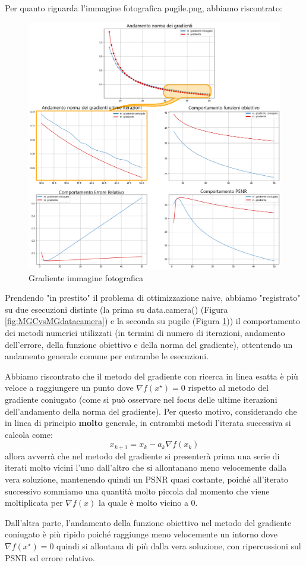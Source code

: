 Per quanto riguarda l'immagine fotografica pugile.png, abbiamo riscontrato: 

\begin{figure}[H]
    \centering
    \includegraphics[width=\textwidth]{output/MGCvsMG-pugile-enph.png}
    \caption{Gradiente immagine fotografica}
    \label{fig:MGCvsMG-pugile}
\end{figure}

Prendendo "in prestito" il problema di ottimizzazione naive,
abbiamo "registrato" su due esecuzioni distinte (la prima su data.camera() 
(Figura \ref{fig:MGCvsMGdatacamera}) e la seconda su pugile 
(Figura \ref{fig:MGCvsMG-pugile}))
il comportamento dei metodi numerici utilizzati (in termini di numero di iterazioni, andamento 
dell'errore, della funzione obiettivo e della norma del gradiente), ottentendo un andamento 
generale comune per entrambe le esecuzioni.

Abbiamo riscontrato che il metodo del gradiente con ricerca in linea esatta è più veloce a
 raggiungere un punto dove $\nabla f(x^{\star})=0$ rispetto al metodo del gradiente coniugato
 (come si può osservare nel focus delle ultime iterazioni dell'andamento della norma del gradiente).
 Per questo motivo, considerando 
 che in linea di principio \textbf{molto} generale, in entrambii metodi l'iterata successiva si calcola come:
 \[x_{k+1} = x_k - a_k \nabla f(x_k)\]
allora avverrà che nel metodo del gradiente si presenterà prima una serie di iterati molto
 vicini l'uno dall'altro che si allontanano meno velocemente dalla vera soluzione, mantenendo quindi un PSNR
 quasi costante, poiché all'iterato successivo sommiamo una quantità molto piccola dal momento
 che viene moltiplicata per $\nabla f(x)$ la quale è molto vicino a 0. 

Dall'altra parte, l'andamento della funzione obiettivo nel metodo del gradiente coniugato è 
più ripido poiché raggiunge meno velocemente un intorno dove $\nabla f(x^{\star}) = 0$ quindi si allontana di più
 dalla vera soluzione, con ripercussioni sul PSNR ed errore relativo.